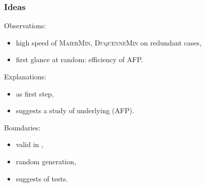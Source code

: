 \begin{frame}
\frametitle{Ideas}

Observations:
\begin{itemize}
	\item high speed of \textsc{MaierMin}, \textsc{DuquenneMin} on redundant cases,
	\item first glance at random: efficiency of AFP.
\end{itemize}

\vspace{0.5em}

Explanations:
\begin{itemize}
	\item {} as first step,
	\item suggests a study of underlying  (AFP).
\end{itemize}

\vspace{0.5em}

Boundaries:
\begin{itemize}
	\item valid in ,
	\item random generation,
	\item suggests  of tests.
\end{itemize}

\end{frame}